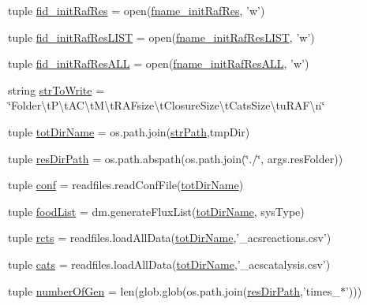 \begin{DoxyCompactItemize}
\item 
tuple \hyperlink{a00117_a98d514a663f6bedde329d0bbbd2b78fa}{fid\-\_\-init\-Raf\-Res} = open(\hyperlink{a00117_a72ed3f9434cc4dcc2240c6ca408960ff}{fname\-\_\-init\-Raf\-Res}, 'w')
\item 
tuple \hyperlink{a00117_ae24c607a37f0f3f23d7e87f6bb4fe45b}{fid\-\_\-init\-Raf\-Res\-L\-I\-S\-T} = open(\hyperlink{a00117_adf05ced8171427a0ea7daf7e595f72b6}{fname\-\_\-init\-Raf\-Res\-L\-I\-S\-T}, 'w')
\item 
tuple \hyperlink{a00117_a45aeb03f0d9cc30cb0a490354fd76d6c}{fid\-\_\-init\-Raf\-Res\-A\-L\-L} = open(\hyperlink{a00117_a1b43b3b737d94a412b2334b78252cdef}{fname\-\_\-init\-Raf\-Res\-A\-L\-L}, 'w')
\item 
string \hyperlink{a00117_ab9980383a541b03ce91d6b812a4bf79a}{str\-To\-Write} = \char`\"{}Folder\textbackslash{}t\-P\textbackslash{}t\-A\-C\textbackslash{}t\-M\textbackslash{}t\-R\-A\-Fsize\textbackslash{}t\-Closure\-Size\textbackslash{}t\-Cats\-Size\textbackslash{}tu\-R\-A\-F\textbackslash{}n\char`\"{}
\item 
tuple \hyperlink{a00117_a82f73a786e4c93e909fd689ee0d0812e}{tot\-Dir\-Name} = os.\-path.\-join(\hyperlink{a00117_ac0b5b603b5f89c10838ce6a42be8c6f7}{str\-Path},tmp\-Dir)
\item 
tuple \hyperlink{a00117_a93d7d68ada532b3cedaab103283ab91a}{res\-Dir\-Path} = os.\-path.\-abspath(os.\-path.\-join(\char`\"{}./\char`\"{}, args.\-res\-Folder))
\item 
tuple \hyperlink{a00117_adc567db25548116293968a9102beab98}{conf} = readfiles.\-read\-Conf\-File(\hyperlink{a00117_a82f73a786e4c93e909fd689ee0d0812e}{tot\-Dir\-Name})
\item 
tuple \hyperlink{a00117_a07ce1f0750b6dc5baff89792fc194152}{food\-List} = dm.\-generate\-Flux\-List(\hyperlink{a00117_a82f73a786e4c93e909fd689ee0d0812e}{tot\-Dir\-Name}, sys\-Type)
\item 
tuple \hyperlink{a00117_ac2fe1ed3228b8e616f25ccfbe4cc7dc4}{rcts} = readfiles.\-load\-All\-Data(\hyperlink{a00117_a82f73a786e4c93e909fd689ee0d0812e}{tot\-Dir\-Name},'\-\_\-acsreactions.\-csv')
\item 
tuple \hyperlink{a00117_adc0282a6415a88834556e66807bcc800}{cats} = readfiles.\-load\-All\-Data(\hyperlink{a00117_a82f73a786e4c93e909fd689ee0d0812e}{tot\-Dir\-Name},'\-\_\-acscatalysis.\-csv')
\item 
tuple \hyperlink{a00117_aabf82b9e9c2293000a67162becdd440d}{number\-Of\-Gen} = len(glob.\-glob(os.\-path.\-join(\hyperlink{a00117_a93d7d68ada532b3cedaab103283ab91a}{res\-Dir\-Path},'times\-\_\-$\ast$')))

\end{DoxyCompactItemize}
